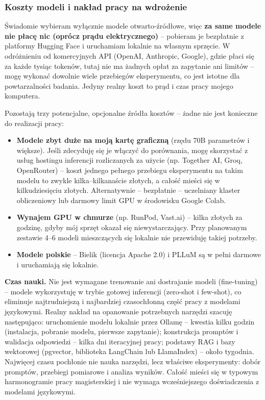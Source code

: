 \documentclass[12pt,a4paper]{article}
\newcommand{\topicsection}[1]{\subsubsection*{#1}}
\begin{document}
\topicsection{Koszty modeli i nakład pracy na wdrożenie}
Świadomie wybieram wyłącznie modele otwarto-źródłowe, więc \textbf{za same modele nie płacę nic (oprócz prądu elektrycznego)} -- pobieram je bezpłatnie z platformy Hugging Face i uruchamiam lokalnie na własnym sprzęcie. W odróżnieniu od komercyjnych API (OpenAI, Anthropic, Google), gdzie płaci się za każde tysiąc tokenów, tutaj nie ma żadnych opłat za zapytanie ani limitów -- mogę wykonać dowolnie wiele przebiegów eksperymentu, co jest istotne dla powtarzalności badania. Jedyny realny koszt to prąd i czas pracy mojego komputera.

Pozostają trzy potencjalne, opcjonalne źródła kosztów -- żadne nie jest konieczne do realizacji pracy:

\begin{itemize}
\item \textbf{Modele zbyt duże na moją kartę graficzną} (rzędu 70B parametrów i większe). Jeśli zdecyduję się je włączyć do porównania, mogę skorzystać z usług hostingu inferencji rozliczanych za użycie (np. Together AI, Groq, OpenRouter) -- koszt jednego pełnego przebiegu eksperymentu na takim modelu to zwykle kilka--kilkanaście złotych, a całość mieści się w kilkudziesięciu złotych. Alternatywnie -- bezpłatnie -- uczelniany klaster obliczeniowy lub darmowy limit GPU w środowisku Google Colab.
\item \textbf{Wynajem GPU w chmurze} (np. RunPod, Vast.ai) -- kilka złotych za godzinę, gdyby mój sprzęt okazał się niewystarczający. Przy planowanym zestawie 4--6 modeli mieszczących się lokalnie nie przewiduję takiej potrzeby.
\item \textbf{Modele polskie} -- Bielik (licencja Apache 2.0) i PLLuM są w pełni darmowe i uruchamiają się lokalnie.
\end{itemize}

\textbf{Czas nauki.} Nie jest wymagane trenowanie ani dostrajanie modeli (fine-tuning) -- modele wykorzystuję w trybie gotowej inferencji (zero-shot i few-shot), co eliminuje najtrudniejszą i najbardziej czasochłonną część pracy z modelami językowymi. Realny nakład na opanowanie potrzebnych narzędzi szacuję następująco: uruchomienie modelu lokalnie przez Ollamę -- kwestia kilku godzin (instalacja, pobranie modelu, pierwsze zapytanie); konstrukcja promptów i walidacja odpowiedzi -- kilka dni iteracyjnej pracy; podstawy RAG i bazy wektorowej (pgvector, biblioteka LangChain lub LlamaIndex) -- około tygodnia. Najwięcej czasu pochłonie nie nauka narzędzi, lecz właściwe eksperymenty: dobór promptów, przebiegi pomiarowe i analiza wyników. Całość mieści się w typowym harmonogramie pracy magisterskiej i nie wymaga wcześniejszego doświadczenia z modelami językowymi.
\end{document}
